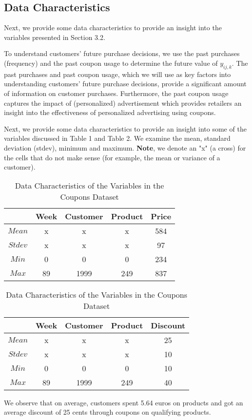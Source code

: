 \subsection{Data Characteristics}
Next, we provide some data characteristics to provide an insight into the
variables presented in Section 3.2.

To understand customers' future purchase decisions, we use the past purchases
(frequency) and the past coupon usage to determine the future value of
$y_{ij,k}$. The past purchases and past coupon usage, which we will use as key factors
into understanding customers' future purchase decisions, provide a significant
amount of information on customer purchases. Furthermore, the past coupon usage
captures the impact of (personalized) advertisement which provides retailers an
insight into the effectiveness of personalized advertising using
coupons.

Next, we provide some data characteristics to provide an insight into some of the
variables discussed in Table 1 and Table 2. We examine the mean, standard
deviation (stdev), minimum and maximum. 
\textbf{Note}, we denote an "x" (a cross) for the cells that do not
make sense (for example, the mean or variance of a customer).

\begin{table}[H]
\parbox{.45\linewidth}{
\centering
\scalebox{0.85}
{
    \begin{tabular}{| c | c | c | c | c |}
    \hline
    & Week & Customer & Product & Price \\
    \hline
    $Mean$ & x & x & x & 584 \\
    \hline
    $Stdev$ & x & x & x & 97 \\
    \hline
    $Min$ & 0 & 0 & 0 & 234 \\
    \hline
    $Max$ & 89 & 1999 & 249 & 837 \\
    \hline
    \end{tabular}
}
\caption{Data Characteristics of the Variables in the Customers/Baskets Dataset}
}
\hfill
\parbox{.50\linewidth}{
\centering
\scalebox{0.85}
{
    \begin{tabular}{| c | c | c | c | c |}
    \hline
    & Week & Customer & Product & Discount \\
    \hline
    $Mean$ & x & x & x & 25 \\
    \hline
    $Stdev$ & x & x & x & 10 \\
    \hline
    $Min$ & 0 & 0 & 0 & 10 \\
    \hline
    $Max$ & 89 & 1999 & 249 & 40 \\
    \hline
    \end{tabular}
}
\caption{Data Characteristics of the Variables in the Coupons Dataset}
}
\end{table}
We observe that on average, customers spent 5.64 euros on products and got an
average discount of 25 cents through coupons on qualifying products.


